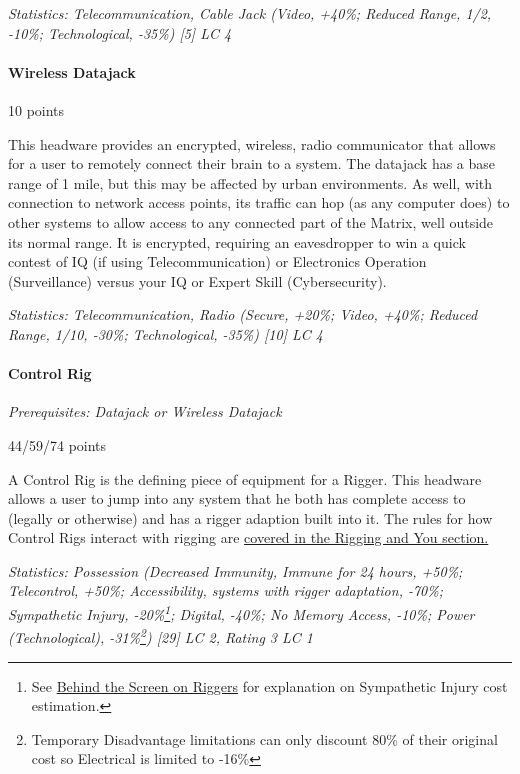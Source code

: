 \begin{multicols*}{3}
	\textit{\textcolor{OliveGreen}{Statistics: Telecommunication, Cable Jack (Video, +40\%; Reduced Range, 1/2, -10\%; Technological, -35\%) [5] LC 4}}
	
	\paragraph{Wireless Datajack}
	\begin{flushright}
		10 points
	\end{flushright}
	
	This headware provides an encrypted, wireless, radio communicator that allows for a user to remotely connect their brain to a system. The datajack has a base range of 1 mile, but this may be affected by urban environments. As well, with connection to network access points, its traffic can hop (as any computer does) to other systems to allow access to any connected part of the Matrix, well outside its normal range. It is encrypted, requiring an eavesdropper to win a quick contest of IQ (if using Telecommunication) or Electronics Operation (Surveillance) versus your IQ or Expert Skill (Cybersecurity).
	
	\textit{\textcolor{OliveGreen}{Statistics: Telecommunication, Radio (Secure, +20\%; Video, +40\%; Reduced Range, 1/10, -30\%; Technological, -35\%) [10] LC 4}}
	
	\paragraph{Control Rig}\label{control_rig}
	\textit{Prerequisites: Datajack or Wireless Datajack}
	\begin{flushright}
		44/59/74 points
	\end{flushright}
	
	A Control Rig is the defining piece of equipment for a Rigger. This headware allows a user to jump into any system that he both has complete access to (legally or otherwise) and has a rigger adaption built into it. The rules for how Control Rigs interact with rigging are \hyperref[riggers]{covered in the Rigging and You section.}
	
	\textit{\textcolor{OliveGreen}{Statistics: Possession (Decreased Immunity, Immune for 24 hours, +50\%; Telecontrol, +50\%; Accessibility, systems with rigger adaptation, -70\%; Sympathetic Injury, -20\%\footnote{See \hyperref[bts_riggers]{Behind the Screen on Riggers} for explanation on Sympathetic Injury cost estimation.}; Digital, -40\%; No Memory Access, -10\%; Power (Technological), -31\%\footnote{Temporary Disadvantage limitations can only discount 80\% of their original cost  so Electrical is limited to -16\%}) [29] LC 2, Rating 3 LC 1}}
	

\end{multicols*}
